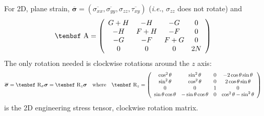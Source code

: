 \documentclass[11pt]{book}
\renewcommand{\vec}[1]{\boldsymbol{#1}}
\def\A{\hbox{\tenbsf A}}
\def\R{\hbox{\tenbsf R}}
\def\s#1{\sigma_{#1}}
\def\t#1{\tau_{#1}}
\begin{document}
For 2D, plane strain, $\overline{\vec\sigma} = (\overline{\s{xx}}, \overline{\s{yy}}, \s{zz}, \overline{\t{xy}})$ ({\em i.e.}, $\s{zz}$ does not rotate) and
\begin{equation}
      \A = \left( \begin{array}{cccc}
                       G+H & -H & -G & 0 \\
                       -H & F+H & -F & 0 \\
                       -G & -F & F+G & 0 \\
                       0 & 0 & 0 & 2N
                       \end{array} \right)
\end{equation}
The only rotation needed is clockwise rotations around the $z$ axis:
\begin{equation}
      \overline{\vec\sigma} = \R_\sigma\vec\sigma = \R_z\vec\sigma  \quad{\rm where}\quad \R_z = \left( \begin{array}{cccc}
                       \cos^2\theta & \sin^2\theta & 0 & -2\cos\theta\sin\theta \\
                       \sin^2\theta & \cos^2\theta & 0 & 2\cos\theta\sin\theta \\
                       0 & 0 & 1 & 0 \\
                       \sin\theta\cos\theta & -\sin\theta\cos\theta & 0 & \cos^2\theta - \sin^2\theta
                       \end{array} \right)
\end{equation}
is the 2D engineering stress tensor, clockwise rotation matrix.
\end{document}
